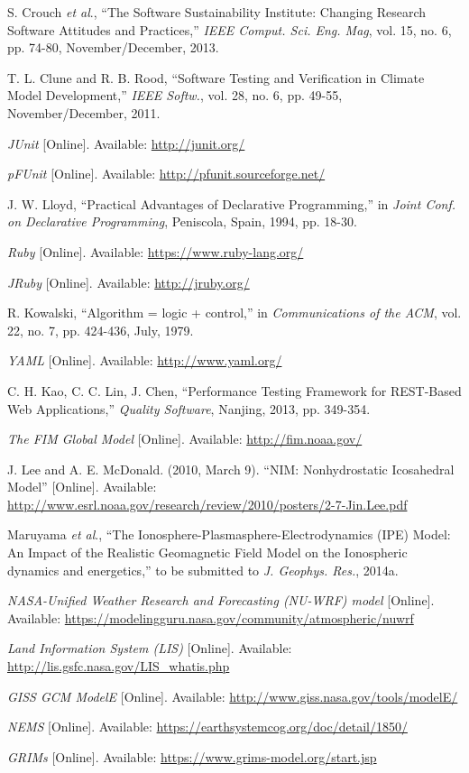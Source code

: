 \documentclass[conference]{IEEEtran}
\begin{document}
\begin{thebibliography}{1}
S. Crouch \emph{et al}., ``The Software Sustainability Institute: Changing Research Software Attitudes and Practices,'' \emph{IEEE Comput. Sci. Eng. Mag}, vol. 15, no. 6, pp. 74-80, November/December, 2013.

T. L. Clune and R. B. Rood, ``Software Testing and Verification in Climate Model Development,'' \emph{IEEE Softw.}, vol. 28, no. 6, pp. 49-55, November/December, 2011.

\emph{JUnit} [Online]. Available: \url{http://junit.org/}

\emph{pFUnit} [Online]. Available: \url{http://pfunit.sourceforge.net/}

J. W. Lloyd, ``Practical Advantages of Declarative Programming,'' in \emph{Joint Conf. on Declarative Programming}, Peniscola, Spain, 1994, pp. 18-30.

\emph{Ruby} [Online]. Available: \url{https://www.ruby-lang.org/}

\vspace{150mm} %

\emph{JRuby} [Online]. Available: \url{http://jruby.org/}

R. Kowalski, ``Algorithm = logic + control,'' in \emph{Communications of the ACM}, vol. 22, no. 7, pp. 424-436, July, 1979.

\emph{YAML} [Online]. Available: \url{http://www.yaml.org/}

C. H. Kao, C. C. Lin, J. Chen, ``Performance Testing Framework for REST-Based Web Applications,'' \emph{Quality Software}, Nanjing, 2013, pp. 349-354.

\emph{The FIM Global Model} [Online]. Available: \url{http://fim.noaa.gov/}

J. Lee and A. E. McDonald. (2010, March 9). ``NIM: Nonhydrostatic Icosahedral Model'' [Online]. Available: \url{http://www.esrl.noaa.gov/research/review/2010/posters/2-7-Jin.Lee.pdf}

Maruyama \emph{et al}., ``The Ionosphere-Plasmasphere-Electrodynamics (IPE) Model: An Impact of the Realistic Geomagnetic Field Model on the Ionospheric dynamics and energetics,'' to be submitted to \emph{J. Geophys. Res.}, 2014a.

\emph{NASA-Unified Weather Research and Forecasting (NU-WRF) model} [Online]. Available: \url{https://modelingguru.nasa.gov/community/atmospheric/nuwrf}

\emph{Land Information System (LIS)} [Online]. Available: \url{http://lis.gsfc.nasa.gov/LIS_whatis.php}

\emph{GISS GCM ModelE} [Online]. Available: \url{http://www.giss.nasa.gov/tools/modelE/}

\emph{NEMS} [Online]. Available: \url{https://earthsystemcog.org/doc/detail/1850/}

\emph{GRIMs} [Online]. Available: \url{https://www.grims-model.org/start.jsp}


\end{thebibliography}
\end{document}
